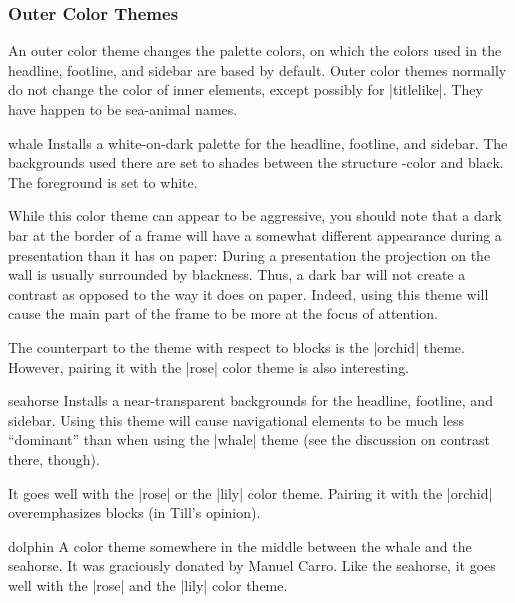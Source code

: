 \subsubsection{Outer Color Themes}

An outer color theme changes the palette colors, on which the colors used in the headline, footline, and sidebar are based by default. Outer color themes normally do not change the color of inner elements, except possibly for |titlelike|. They have happen to be sea-animal names.

\begin{colorthemeexample}{whale}
  Installs a white-on-dark palette for the headline, footline, and sidebar. The backgrounds used there are set to shades between the structure \beamer-color and black. The foreground is set to white.

  While this color theme can appear to be aggressive, you should note that a dark bar at the border of a frame will have a somewhat different appearance during a presentation than it has on paper: During a presentation the projection on the wall is usually surrounded by blackness. Thus, a dark bar will not create a contrast as opposed to the way it does on paper. Indeed, using this theme will cause the main part of the frame to be more at the focus of attention.

  The counterpart to the theme with respect to blocks is the |orchid| theme. However, pairing it with the |rose| color theme is also interesting.
\end{colorthemeexample}

\begin{colorthemeexample}{seahorse}
  Installs a near-transparent backgrounds for the headline, footline, and sidebar. Using this theme will cause navigational elements to be much less ``dominant'' than when using the |whale| theme (see the discussion on contrast there, though).

  It goes well with the |rose| or the |lily| color theme. Pairing it with the |orchid| overemphasizes blocks (in Till's opinion).
\end{colorthemeexample}

\begin{colorthemeexample}{dolphin}
  A color theme somewhere in the middle between the whale and the seahorse. It was graciously donated by Manuel Carro. Like the seahorse, it goes well with the |rose| and the |lily| color theme.
\end{colorthemeexample}


